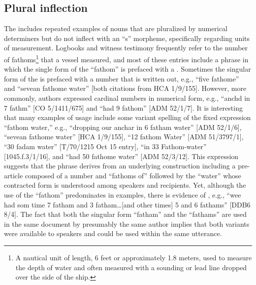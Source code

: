 \subsection{{Plural inflection}}%

The  includes repeated examples of nouns that are pluralized by numerical determiners but do not inflect with an “s” morpheme, specifically regarding units of measurement. Logbooks and witness testimony frequently refer to the number of fathoms\footnote{A nautical unit of length, 6 feet or approximately 1.8 meters, used to measure the depth of water and often measured with a sounding or lead line dropped over the side of the ship.} that a vessel measured, and most of these entries include a phrase in which the single form of the  “fathom” is prefaced with a . Sometimes the singular form of the  is prefaced with a number that is written out, e.g., “five fathome” and “sevean fathome water” [both citations from HCA 1/9/155]. However, more commonly, authors expressed cardinal numbers in numerical form, e.g., “anchd in 7 fathm” [CO 5/1411/675] and “had 9 fathom” [ADM 52/1/7]. It is interesting that many examples of usage include some variant spelling of the fixed expression “fathom water,” e.g., “dropping our anchar in 6 fatham water” [ADM 52/1/6], “sevean fathome water” [HCA 1/9/155], “12 fathom Water” [ADM 51/3797/1], “30 fadam water” [T/70/1215 Oct 15 entry], “in 33 Fathom-water” [1045.f.3/1/16], and “had 50 fathome water” [ADM 52/3/12]. This expression suggests that the phrase derives from an underlying construction including a pre-article composed of a number and “fathoms of” followed by the  “water” whose contracted form is understood among speakers and recipients. Yet, although the use of the   “fathom” predominates in  examples, there is evidence of , e.g., “wee had som time 7 fatham and 3 fatham…[and other times] 5 and 6 fathams” [DDB6 8/4]. The fact that both the singular form “fatham” and the  “fathams” are used in the same document by presumably the same author implies that both variants were available to speakers and could be used within the same utterance. 

